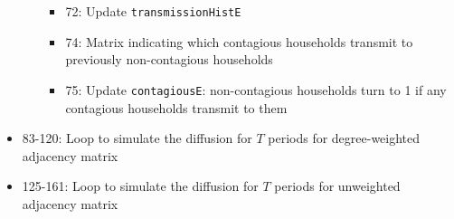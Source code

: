 \documentclass[10pt,letterpaper]{article}
\begin{document}
\begin{itemize}
\begin{itemize}
\begin{itemize}
          \item 72: Update \texttt{transmissionHistE}
          \item 74: Matrix indicating which contagious households transmit to previously non-contagious households
          \item 75: Update \texttt{contagiousE}: non-contagious households turn to 1 if any contagious households transmit to them
        \end{itemize}
    \end{itemize}
  \item 83-120: Loop to simulate the diffusion for $T$ periods for degree-weighted adjacency matrix
  \item 125-161: Loop to simulate the diffusion for $T$ periods for unweighted adjacency matrix
\end{itemize}


\clearpage
%
%
\end{document}
